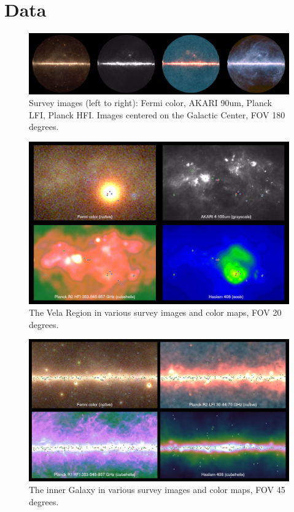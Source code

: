 \renewcommand{\thefootnote}{\arabic{footnote}}

\section{Data}

\begin{figure}[tb]
  \centerline{\includegraphics[width=\textwidth]{figures/four_images}}
  \caption{Survey images (left to right): Fermi color, AKARI 90um, Planck LFI, Planck HFI. Images centered on the Galactic Center, FOV 180 degrees.}
  \label{fig:four_images}
\end{figure}

\begin{figure}[tb]
  \centerline{\includegraphics[width=\textwidth]{figures/vela_region}}
  \caption{The Vela Region in various survey images and color maps, FOV 20 degrees.}
  \label{fig:vela_region}
\end{figure}

\begin{figure}[tb]
  \centerline{\includegraphics[width=\textwidth]{figures/inner_galaxy_region}}
  \caption{The inner Galaxy in various survey images and color maps, FOV 45 degrees.}
\end{figure}

